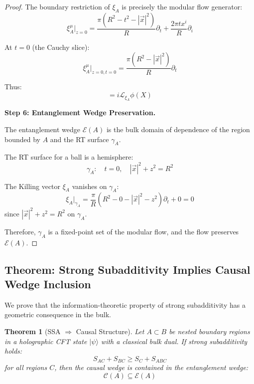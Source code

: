 \documentclass[12pt,a4paper]{article}
\newtheorem{theorem}{Theorem}[section]
\begin{document}
\begin{proof}
The boundary restriction of $\xi_A$ is precisely the modular flow generator:
\begin{equation}
\xi_A^\mu|_{z=0} = \frac{\pi(R^2 - t^2 - |\vec{x}|^2)}{R}\partial_t + \frac{2\pi t x^i}{R}\partial_i
\end{equation}

At $t = 0$ (the Cauchy slice):
\begin{equation}
\xi_A^\mu|_{z=0, t=0} = \frac{\pi(R^2 - |\vec{x}|^2)}{R}\partial_t
\end{equation}

Thus:
\begin{equation}
[\phi(X), H_A] = i \mathcal{L}_{\xi_A}\phi(X)
\end{equation}

\textbf{Step 6: Entanglement Wedge Preservation.}

The entanglement wedge $\mathcal{E}(A)$ is the bulk domain of dependence of the region bounded by $A$ and the RT surface $\gamma_A$.

The RT surface for a ball is a hemisphere:
\begin{equation}
\gamma_A: \quad t = 0, \quad |\vec{x}|^2 + z^2 = R^2
\end{equation}

The Killing vector $\xi_A$ vanishes on $\gamma_A$:
\begin{equation}
\xi_A|_{\gamma_A} = \frac{\pi}{R}(R^2 - 0 - |\vec{x}|^2 - z^2)\partial_t + 0 = 0
\end{equation}
since $|\vec{x}|^2 + z^2 = R^2$ on $\gamma_A$.

Therefore, $\gamma_A$ is a fixed-point set of the modular flow, and the flow preserves $\mathcal{E}(A)$.
\end{proof}

\subsection{Theorem: Strong Subadditivity Implies Causal Wedge Inclusion}

We prove that the information-theoretic property of strong subadditivity has a geometric consequence in the bulk.

\begin{theorem}[SSA $\Rightarrow$ Causal Structure]\label{thm:ssa-causal}
Let $A \subset B$ be nested boundary regions in a holographic CFT state $|\psi\rangle$ with a classical bulk dual. If strong subadditivity holds:
\begin{equation}
S_{AC} + S_{BC} \geq S_C + S_{ABC}
\end{equation}
for all regions $C$, then the causal wedge is contained in the entanglement wedge:
\begin{equation}
\mathcal{C}(A) \subseteq \mathcal{E}(A)
\end{equation}
\end{theorem}
\end{document}
